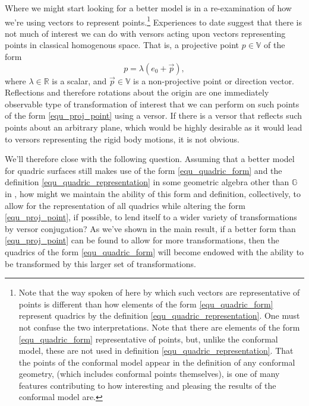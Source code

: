 \documentclass{birkjour}
\theoremstyle{definition}
\theoremstyle{remark}
\numberwithin{equation}{section}
\newcommand{\G}{\mathbb{G}}
\newcommand{\V}{\mathbb{V}}
\newcommand{\R}{\mathbb{R}}
\begin{document}
Where we might start looking for a better model is in a re-examination of how we're using
vectors to represent points.\footnote{Note that the way spoken of here by which such vectors are
representative of points is different than how elements of the form \eqref{equ_quadric_form}
represent quadrics by the definition \eqref{equ_quadric_representation}.  One must not
confuse the two interpretations.  Note that there are elements of the form \eqref{equ_quadric_form}
representative of points, but, unlike the conformal model, these are not used in definition
\eqref{equ_quadric_representation}.  That the points of the conformal model appear
in the definition of any conformal geometry, (which includes conformal points themselves), is one of many
features contributing to how interesting and pleasing the results of the conformal model are.}
Experiences to date suggest that there is not much of interest we can do with versors acting
upon vectors representing points in classical homogenous space.  That is, a projective point $p\in\V$
of the form
\begin{equation}\label{equ_proj_point}
p = \lambda(e_0 + \vec{p}),
\end{equation}
where $\lambda\in\R$ is a scalar, and $\vec{p}\in\V$ is a non-projective point or direction vector.  Reflections and therefore rotations
about the origin are one immediately observable type of transformation of interest
that we can perform on such points of the form \eqref{equ_proj_point} using a versor.
If there is a versor that reflects such points about
an arbitrary plane, which would be highly desirable as it would lead to versors
representing the rigid body motions, it is not obvious.

We'll therefore close with the following question.
Assuming that a better model for quadric surfaces still makes use of the form \eqref{equ_quadric_form} and
the definition \eqref{equ_quadric_representation} in some geometric algebra other than $\G$
in \cite{Parkin12}, how might we maintain the ability of this form and definition, collectively,
to allow for the representation of all quadrics while altering the form \eqref{equ_proj_point},
if possible, to lend itself to a wider variety of transformations by versor conjugation?  As we've
shown in the main result, if a better form than \eqref{equ_proj_point} can be found to
allow for more transformations, then
the quadrics of the form \eqref{equ_quadric_form} will become endowed with the ability
to be transformed by this larger set of transformations.



\end{document}
